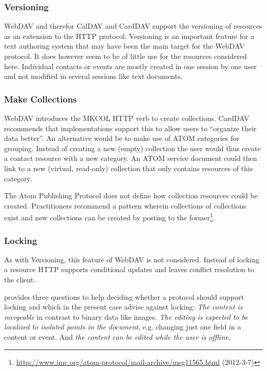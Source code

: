\documentclass[12pt,a4paper,twoside]{scrartcl}		%
\newcommand{\citeurl}[2]{\url{#1} (#2)}
\begin{document}
\subsubsection{Versioning}
WebDAV and therefor CalDAV and CardDAV support the versioning of resources as an
extension to the HTTP protocol. Versioning is an important feature for a text
authoring system that may have been the main target for the WebDAV protocol.  It
does however seem to be of little use for the resources considered
here. Individual contacts or events are mostly created in one session by one
user and not modified in several sessions like text documents.

\subsubsection{Make Collections}
WebDAV introduces the MKCOL HTTP verb to create collections. CardDAV recommends
that implementations support this to allow users to ``organize their data
better''. An alternative would be to make use of ATOM categories for
grouping. Instead of creating a new (empty) collection the user would thus
create a contact resource with a new category. An ATOM service document could
then link to a new (virtual, read-only) collection that only contains resources
of this category.

The Atom Publishing Protocol does not define how collection resources could be
created. Practitioners recommend a pattern wherein collections of collections
exist and new collections can be created by posting to the
former\footnote{\citeurl{http://www.imc.org/atom-protocol/mail-archive/msg11565.html}{2012-3-7}}.

\subsubsection{Locking}
\label{sec:locking}

As with Versioning, this feature of WebDAV is not considered. Instead of
locking a resource HTTP supports conditional updates and leaves conflict
resolution to the client.

\cite[sec. 1]{Nielsen1999} provides three questions to help deciding whether a
protocol should support locking and which in the present case advise against
locking: \textit{The content is mergeable} in contrast to binary data like
images. \textit{The editing is expected to be localized to isolated points in
  the document}, e.g. changing just one field in a content or event. And
\textit{the content can be edited while the user is offline}.
\end{document}
